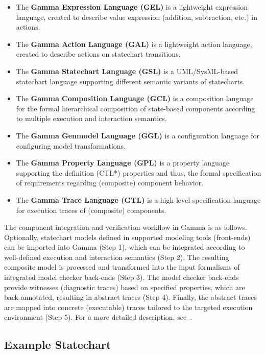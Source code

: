 \begin{itemize}
	\item The \textbf{Gamma Expression Language (GEL)} is a lightweight expression language, created to describe value expression (addition, subtraction, etc.) in actions.
	\item The \textbf{Gamma Action Language (GAL)} is a lightweight action language, created to describe actions on statechart transitions.
	\item The \textbf{Gamma Statechart Language (GSL)} is a UML/SysML-based statechart language supporting different semantic variants of statecharts.
	\item The \textbf{Gamma Composition Language (GCL)} is a composition language for the formal hierarchical composition of state-based 	components according to multiple execution and interaction semantics.
	\item The \textbf{Gamma Genmodel Language (GGL)} is a configuration language for configuring model transformations.
	\item The \textbf{Gamma Property Language (GPL)} is a property language supporting the definition (CTL*) properties and thus, the formal specification of requirements regarding (composite)	component behavior.
	\item The \textbf{Gamma Trace Language (GTL)} is a high-level specification language for  execution traces of (composite) components.
\end{itemize}

The component integration and verification workflow in Gamma is as follows. Optionally, statechart models defined in supported modeling tools (front-ends) can be imported into Gamma (Step 1), which can be integrated according to well-defined execution and interaction semantics (Step 2). The resulting composite model is processed and transformed into the input formalisms of integrated model checker back-ends (Step 3). The model checker back-ends provide witnesses (diagnostic traces) based on specified properties, which are back-annotated, resulting in abstract traces (Step 4).
Finally, the abstract traces are mapped into concrete (executable) traces tailored to the targeted execution environment (Step 5). For a more detailed description, see~\cite{mixed_statecharts_2020}.

\subsection{Example Statechart}

